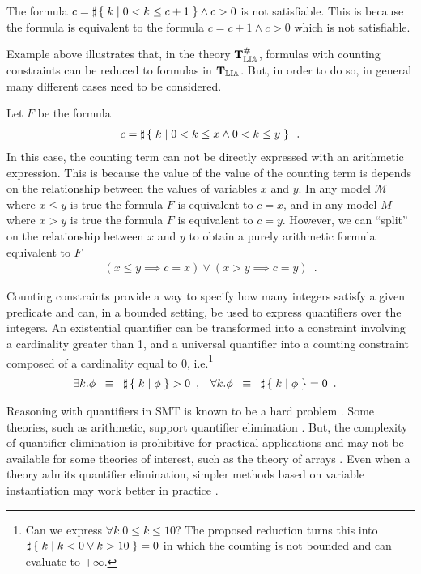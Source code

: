 \begin{example}
\label{ex:simple}
The formula $c = \sharp\left\lbrace\;k\;|\;0 < k \le c + 1\;\right\rbrace \land c > 0$ is
not satisfiable. This is because the formula is equivalent to the
formula $c = c+1 \land c >0$ which is not satisfiable.
\end{example}

Example above illustrates that, in the theory $\operatorname{\mathbf{T}^\#_\mathbb{LIA}}$, formulas with
counting constraints can be reduced to formulas in $\operatorname{\mathbf{T}_\mathbb{LIA}}$. But, in
order to do so, in general many different cases need to be considered.

\begin{example}
\label{ex:disjunction}
Let  $F$ be the formula
\begin{align*}
  c = \sharp\left\lbrace\;k\;|\;0 < k \le x \land 0 < k \le y\;\right\rbrace\enspace.
\end{align*}
In this case, the counting term can not be directly expressed with an
arithmetic expression. This is because the value of the value of the
counting term is depends on the relationship between the values of
variables $x$ and $y$. In any model $\mathcal{M}$ where $x \le y$ is
true the formula $F$ is equivalent to $c = x$, and in any model $M$
where $x > y$ is true the formula $F$ is equivalent to $c = y$.
However, we can ``split'' on the relationship between $x$ and $y$ to
obtain a purely arithmetic formula equivalent to $F$
\begin{align*}
  (x \le y \implies c = x) \lor (x > y \implies c = y)\enspace.
\end{align*}
\end{example}

Counting constraints provide a way to specify how many integers
satisfy a given predicate and can, in a bounded setting, be used to
express quantifiers over the integers. An existential quantifier can
be transformed into a constraint involving a cardinality greater than
1, and a universal quantifier into a counting constraint composed of a
cardinality equal to 0, i.e.\footnote{Can we express $\forall k . 0 \le k \le 10$? The
proposed reduction turns this into $\sharp\left\lbrace\;k\;|\;k < 0 \lor k > 10\;\right\rbrace = 0$
in which the counting is not bounded and can evaluate to $+\infty$.}
\begin{align*}
  \exists k . \phi &\;\;\equiv\;\; \sharp\left\lbrace\;k\;|\;\phi\;\right\rbrace > 0 \enspace, &
  \forall k . \phi &\;\;\equiv\;\; \sharp\left\lbrace\;k\;|\;\phi\;\right\rbrace = 0 \enspace.
\end{align*}

Reasoning with quantifiers in SMT is known to be a hard problem
\cite{ge2010solving,weispfenning1988complexity}. Some theories, such
as arithmetic, support quantifier elimination \cite{cooper}. But, the
complexity of quantifier elimination is prohibitive for practical
applications and may not be available for some theories of interest,
such as the theory of arrays \cite{bradley2006s}. Even when a theory
admits quantifier elimination,  simpler methods based on variable
instantiation may work better in practice \cite{dutertre2015solving}.

